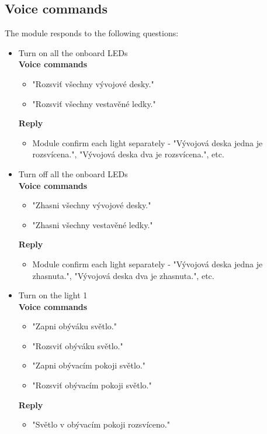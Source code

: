 \subsection{Voice commands}
The module responds to the following questions:
\begin{itemize}
    \item Turn on all the onboard LEDs\\
    \textbf{Voice commands}
    \begin{itemize}
        \item "Rozsviť všechny vývojové desky."
        \item "Rozsviť všechny vestavěné ledky."
    \end{itemize}
    \textbf{Reply}
    \begin{itemize}
        \item Module confirm each light separately - "Vývojová deska jedna je rozsvícena.", "Vývojová deska dva je rozsvícena.", etc.
    \end{itemize}
    \item Turn off all the onboard LEDs\\
    \textbf{Voice commands}
    \begin{itemize}
        \item "Zhasni všechny vývojové desky."
        \item "Zhasni všechny vestavěné ledky."
    \end{itemize}
    \textbf{Reply}
    \begin{itemize}
        \item Module confirm each light separately - "Vývojová deska jedna je zhasnuta.", "Vývojová deska dva je zhasnuta.", etc.
    \end{itemize}    
    \item Turn on the light 1\\
    \textbf{Voice commands}
    \begin{itemize}
        \item "Zapni obýváku světlo."
        \item "Rozsviť obýváku světlo."
        \item "Zapni obývacím pokoji světlo."
        \item "Rozsviť obývacím pokoji světlo."
    \end{itemize}
    \textbf{Reply}
    \begin{itemize}
        \item "Světlo v obývacím pokoji rozsvíceno."
    \end{itemize} 

\end{itemize}
